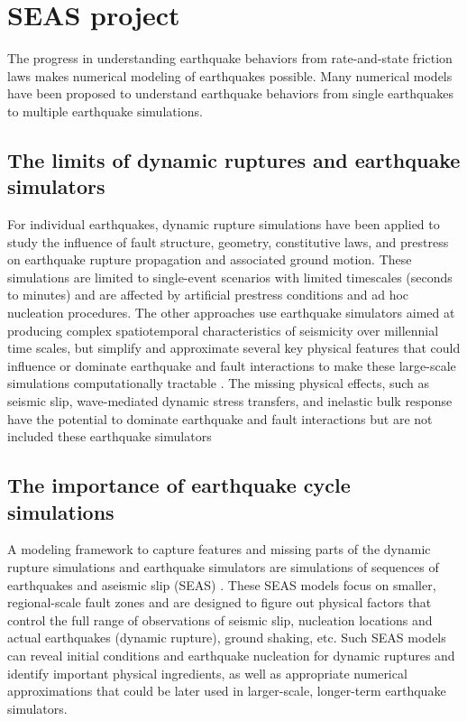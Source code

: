 \section{SEAS project}
The progress in understanding earthquake behaviors from rate-and-state friction laws makes numerical modeling of earthquakes possible. Many numerical models have been proposed to understand earthquake behaviors from single earthquakes to multiple earthquake simulations.

\subsection{The limits of dynamic ruptures and earthquake simulators}
For individual earthquakes, dynamic rupture simulations have been applied to study the influence of fault structure, geometry, constitutive laws, and prestress on earthquake rupture propagation and associated ground motion.
These simulations are limited to single-event scenarios with limited timescales (seconds to minutes) and are affected by artificial prestress conditions and ad hoc nucleation procedures.
The other approaches use earthquake simulators aimed at producing complex spatiotemporal characteristics of seismicity over millennial time scales, but simplify and approximate several key physical features that could influence or dominate earthquake and fault interactions to make these large-scale simulations computationally tractable \citep{10.1785/0220120105,10.1785/0220120093}. 
The missing physical effects, such as seismic slip, wave-mediated dynamic stress transfers, and inelastic bulk response have the potential to dominate earthquake and fault interactions but are not included these earthquake simulators

\subsection{The importance of earthquake cycle simulations}
A modeling framework to capture features and missing parts of the dynamic rupture simulations and earthquake simulators are simulations of sequences of earthquakes and aseismic slip (SEAS) \citep{10.1785/0220190248}.
These SEAS models focus on smaller, regional-scale fault zones and are designed to figure out physical factors that control the full range of observations of seismic slip, nucleation locations and actual earthquakes (dynamic rupture), ground shaking, etc.
Such SEAS models can reveal initial conditions and earthquake nucleation for dynamic ruptures and identify important physical ingredients, as well as appropriate numerical approximations that could be later used in larger-scale, longer-term earthquake simulators.

